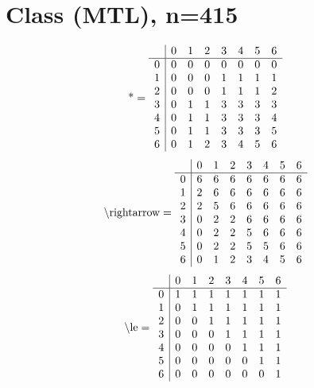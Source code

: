 \documentclass[11pt]{article}
\begin{document}
\section{Class (MTL), n=415}
\[\text{*} = 
\begin{array}{r | r r r r r r r}
 & 0 & 1 & 2 & 3 & 4 & 5 & 6 \\ \hline
0 & 0 & 0 & 0 & 0 & 0 & 0 & 0 \\
1 & 0 & 0 & 0 & 1 & 1 & 1 & 1 \\
2 & 0 & 0 & 0 & 1 & 1 & 1 & 2 \\
3 & 0 & 1 & 1 & 3 & 3 & 3 & 3 \\
4 & 0 & 1 & 1 & 3 & 3 & 3 & 4 \\
5 & 0 & 1 & 1 & 3 & 3 & 3 & 5 \\
6 & 0 & 1 & 2 & 3 & 4 & 5 & 6 \\
\end{array}
\]
\[\text{\textbackslash rightarrow} = 
\begin{array}{r | r r r r r r r}
 & 0 & 1 & 2 & 3 & 4 & 5 & 6 \\ \hline
0 & 6 & 6 & 6 & 6 & 6 & 6 & 6 \\
1 & 2 & 6 & 6 & 6 & 6 & 6 & 6 \\
2 & 2 & 5 & 6 & 6 & 6 & 6 & 6 \\
3 & 0 & 2 & 2 & 6 & 6 & 6 & 6 \\
4 & 0 & 2 & 2 & 5 & 6 & 6 & 6 \\
5 & 0 & 2 & 2 & 5 & 5 & 6 & 6 \\
6 & 0 & 1 & 2 & 3 & 4 & 5 & 6 \\
\end{array}
\]
\[\text{\textbackslash le} = 
\begin{array}{r | r r r r r r r}
 & 0 & 1 & 2 & 3 & 4 & 5 & 6 \\ \hline
0 & 1 & 1 & 1 & 1 & 1 & 1 & 1 \\
1 & 0 & 1 & 1 & 1 & 1 & 1 & 1 \\
2 & 0 & 0 & 1 & 1 & 1 & 1 & 1 \\
3 & 0 & 0 & 0 & 1 & 1 & 1 & 1 \\
4 & 0 & 0 & 0 & 0 & 1 & 1 & 1 \\
5 & 0 & 0 & 0 & 0 & 0 & 1 & 1 \\
6 & 0 & 0 & 0 & 0 & 0 & 0 & 1 \\
\end{array}
\]
\end{document}
